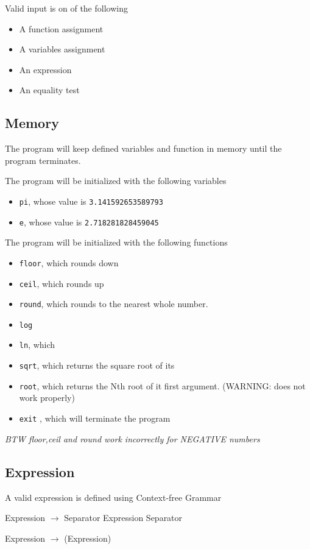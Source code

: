 \documentclass[11pt,a4paper]{article}
\begin{document}
Valid input is on of the following
\begin{itemize}
\item A function assignment
\item A variables assignment
\item An expression
\item An equality test
\end{itemize}
\subsection{Memory}
The program will keep defined variables and function in memory
until the program terminates.


The program will be initialized with the following variables
\begin{itemize}
\item \texttt{pi}, whose value is \texttt{3.141592653589793}
\item \texttt{e}, whose value is \texttt{2.718281828459045}
\end{itemize}


The program will be initialized with the following functions
\begin{itemize}
\item \texttt{floor}, which rounds down
\item \texttt{ceil}, which rounds up
\item \texttt{round}, which rounds to the nearest  whole number.
\item \texttt{log}
\item \texttt{ln}, which
\item \texttt{sqrt}, which returns the square root of its
\item \texttt{root}, which returns the Nth root of it first argument.  (WARNING: does not work properly)
\item \texttt{exit} , which will terminate the program
\end{itemize}



\emph{BTW floor,ceil and round work incorrectly for NEGATIVE numbers}
\subsection{Expression}
A valid expression is defined using Context-free Grammar

Expression \(\rightarrow\) Separator Expression Separator

Expression \(\rightarrow\) (Expression)
\end{document}
